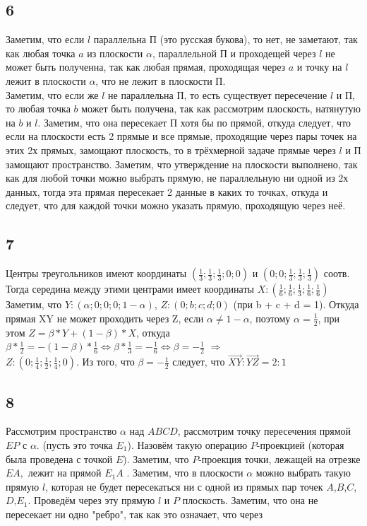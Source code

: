 		\subsection{6}
		Заметим, что если $l$ параллельна П (это русская букова), то нет, не заметают, так как любая точка $a$ из плоскости $\alpha$, параллельной П и проходещей через $l$ не может быть полученна, так как любая прямая, проходящая через $a$ и точку на $l$ лежит в плоскости $\alpha$, что не лежит в плоскости П.\\
		Заметим, что если же $l$ не параллельна П, то есть существует пересечение $l$ и П, то любая точка $b$ может быть получена, так как рассмотрим плоскость, натянутую на $b$ и $l$. Заметим, что она пересекает П хотя бы по прямой, откуда следует, что если на плоскости есть 2 прямые и все прямые, проходящие через пары точек на этих 2х прямых, замощают плоскость, то в трёхмерной задаче прямые через $l$ и П замощают пространство. Заметим, что утверждение на плоскости выполнено, так как для любой точки можно выбрать прямую, не параллельную ни одной из 2х данных, тогда эта прямая пересекает 2 данные в каких то точках, откуда и следует, что для каждой точки можно указать прямую, проходящую через неё.\\
		
		\subsection{7}
		Центры треугольников имеют координаты $(\frac{1}{3};\frac{1}{3};\frac{1}{3};0;0)$ и $(0;0;\frac{1}{3};\frac{1}{3};\frac{1}{3})$ соотв.\\
		Тогда середина между этими центрами имеет координаты $X:(\frac{1}{6};\frac{1}{6};\frac{1}{3};\frac{1}{6};\frac{1}{6})$\\
		Заметим, что $Y:(\alpha;0;0;0;1-\alpha)$, $Z:(0;b;c;d;0)$ (при b + c + d = 1). Откуда прямая XY не может проходить через Z, если $\alpha \ne 1-\alpha$, поэтому $\alpha = \frac{1}{2}$, при этом $Z = \beta*Y + (1-\beta)*X$, откуда $\beta*\frac{1}{2} = -(1 - \beta)*\frac{1}{6} \Leftrightarrow \beta*\frac{1}{3} = -\frac{1}{6} \Leftrightarrow \beta = -\frac{1}{2}$ $\Rightarrow $\\
		$Z : (0;\frac{1}{4};\frac{1}{2};\frac{1}{4};0)$. Из того, что $\beta = -\frac{1}{2}$ следует, что $\overrightarrow{XY} : \overrightarrow{YZ} = 2:1$\\
		
		\subsection{8}
		Рассмотрим пространство $\alpha$ над $ABCD$, рассмотрим точку пересечения прямой $EP$ с $\alpha$. (пусть это точка $E_1$). Назовём такую операцию $P$-проекцией (которая была проведена с точкой $E$). Заметим, что $P$-проекция точки, лежащей на отрезке $EA,$ лежит на прямой $E_1 A$ . Заметим, что в плоскости $\alpha$ можно выбрать такую прямую $l$, которая не будет пересекаться ни с одной из прямых пар точек $A$,$B$,$C$,$D$,$E_1$. Проведём через эту прямую $l$ и $P$ плоскость. Заметим, что она не пересекает ни одно "ребро", так как это означает, что через
		

